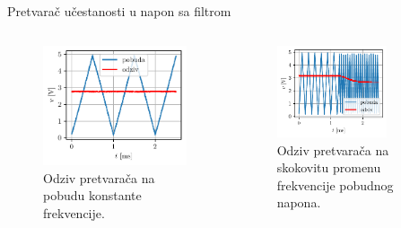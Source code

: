 \documentclass[aspectratio=169,xcolor=dvipsnames]{beamer}
\begin{document}

\begin{frame}{Pretvarač učestanosti u napon sa filtrom}
	\begin{columns}[c]
    \begin{column}{.5\textwidth}
    \begin{figure}
        \centering
        \includegraphics[scale = 0.75]{fig/FV1000sNF.pdf}
        \caption{Odziv pretvarača na pobudu konstante frekvencije.}
    \end{figure}      
    \end{column}
    \begin{column}{.5\textwidth}
    \begin{figure}
        \centering
        \includegraphics[width=0.75\textwidth]{fig/FV1000dNF.pdf}
        \caption{Odziv pretvarača na skokovitu promenu frekvencije pobudnog napona.}
    \end{figure}
    \end{column}
\end{columns}
\end{frame}
\end{document}
